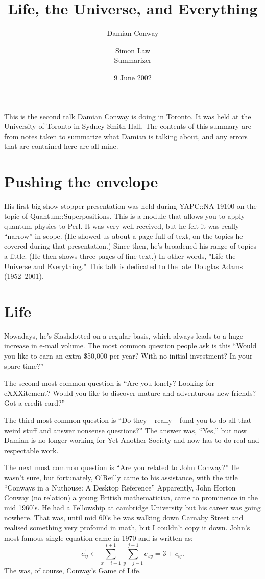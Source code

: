 \documentclass{article}
\title{Life, the Universe, and Everything}
\author{Damian Conway \and Simon Law\\Summarizer}
\date{9 June 2002}
\begin{document}
\maketitle

\noindent This is the second talk Damian Conway is doing in Toronto.  It
was held at the University of Toronto in Sydney Smith Hall.  The
contents of this summary are from notes taken to summarize what Damian
is talking about, and any errors that are contained here are all mine.

\section{Pushing the envelope}
His first big show-stopper presentation was held during YAPC::NA 19100
on the topic of Quantum::Superpositions.  This is a module that allows
you to apply quantum physics to Perl.  It was very well received, but he
felt it was really ``narrow'' in scope.  (He showed us about a page full
of text, on the topics he covered during that presentation.)  Since
then, he's broadened his range of topics a little.  (He then shows three
pages of fine text.)  In other words, "Life the Universe and
Everything."  This talk is dedicated to the late Douglas Adams
(1952--2001).

\section{Life}
Nowadays, he's Slashdotted on a regular basis, which always leads to a
huge increase in e-mail volume.  The most common question people ask is
this ``Would you like to earn an extra \$50,000 per year?  With no 
initial investment?  In your spare time?''

The second most common question is ``Are you lonely?  Looking for
eXXXitement?  Would you like to discover mature and adventurous new
friends?  Got a credit card?''

The third most common question is
``Do they \_really\_ fund you to do all that weird stuff and answer
nonsense questions?''  The answer was, ``Yes,'' but now Damian is no
longer working for Yet Another Society and now has to do real and
respectable work.

The next most common question is
``Are you related to John Conway?''  He wasn't sure, but fortunately,
O'Reilly came to his assistance, with the title ``Conways in a Nuthouse: 
A Desktop Reference''  Apparently, John Horton Conway (no relation) a
young British mathematician, came 
to prominence in the
mid 1960's.  He had a Fellowship at
cambridge University but his career was going nowhere.  That was, until 
mid 60's he was
walking down Carnaby Street and realised something very profound in
math, but I couldn't copy it down.  John's most famous single equation
came in 1970 and is written as:  
\[c_{ij}^\prime \leftarrow \sum_{x=i-1}^{i+1}\sum_{y=j-1}^{j+1}
c_{xy} = 3 + c_{ij}.\]
The was, of course, Conway's Game of Life.
\end{document}
